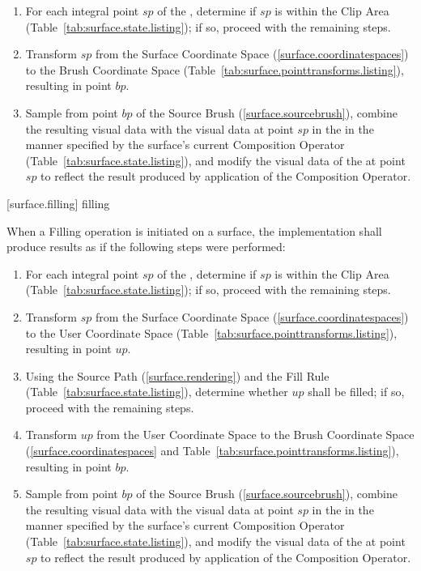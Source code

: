 \begin{enumerate}
\item For each integral point $sp$ of the \underlyingsurface, determine if $sp$ is within the Clip Area (Table~\ref{tab:surface.state.listing}); if so, proceed with the remaining steps.
\item Transform $sp$ from the Surface Coordinate Space (\ref{surface.coordinatespaces}) to the Brush Coordinate Space (Table~\ref{tab:surface.pointtransforms.listing}), resulting in point $bp$.
\item Sample from point $bp$ of the Source Brush (\ref{surface.sourcebrush}), combine the resulting visual data with the visual data at point $sp$ in the \underlyingsurface in the manner specified by the surface's current Composition Operator (Table~\ref{tab:surface.state.listing}), and modify the visual data of the \underlyingsurface at point $sp$ to reflect the result produced by application of the Composition Operator.
\end{enumerate}

 [surface.filling] { filling}

\pnum
When a Filling operation is initiated on a surface, the implementation shall produce results as if the following steps were performed:

\begin{enumerate}
\item For each integral point $sp$ of the \underlyingsurface, determine if $sp$ is within the Clip Area (Table~\ref{tab:surface.state.listing}); if so, proceed with the remaining steps.
\item Transform $sp$ from the Surface Coordinate Space (\ref{surface.coordinatespaces}) to the User Coordinate Space (Table~\ref{tab:surface.pointtransforms.listing}), resulting in point $up$.
\item Using the Source Path (\ref{surface.rendering}) and the Fill Rule (Table~\ref{tab:surface.state.listing}), determine whether $up$ shall be filled; if so, proceed with the remaining steps.
\item Transform $up$ from the User Coordinate Space to the Brush Coordinate Space (\ref{surface.coordinatespaces} and Table~\ref{tab:surface.pointtransforms.listing}), resulting in point $bp$.
\item Sample from point $bp$ of the Source Brush (\ref{surface.sourcebrush}), combine the resulting visual data with the visual data at point $sp$ in the \underlyingsurface in the manner specified by the surface's current Composition Operator (Table~\ref{tab:surface.state.listing}), and modify the visual data of the \underlyingsurface at point $sp$ to reflect the result produced by application of the Composition Operator.
\end{enumerate}

